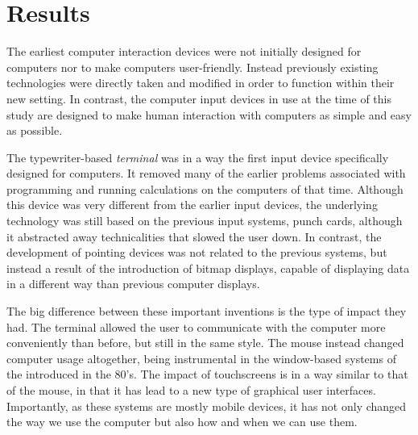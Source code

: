 

\section{Results}


The earliest computer interaction devices were not initially designed for computers nor to make computers user-friendly. Instead previously existing technologies were directly taken and modified in order to function within their new setting. In contrast, the computer input devices in use at the time of this study are designed to make human interaction with computers as simple and easy as possible.

The typewriter-based \emph{terminal} was in a way the first input device specifically designed for computers. It removed many of the earlier problems associated with programming and running calculations on the computers of that time. Although this device was very different from the earlier input devices, the underlying technology was still based on the previous input systems, punch cards, although it abstracted away technicalities that slowed the user down. In contrast, the development of pointing devices was not related to the previous systems, but instead a result of the introduction of bitmap displays, capable of displaying data in a different way than previous computer displays.

The big difference between these important inventions is the type of impact they had. The terminal allowed the user to communicate with the computer more conveniently than before, but still in the same style. The mouse instead changed computer usage altogether, being instrumental in the window-based systems of the introduced in the 80's. The impact of touchscreens is in a way similar to that of the mouse, in that it has lead to a new type of graphical user interfaces. Importantly, as these systems are mostly mobile devices, it has not only changed the way we use the computer but also how and when we can use them.



